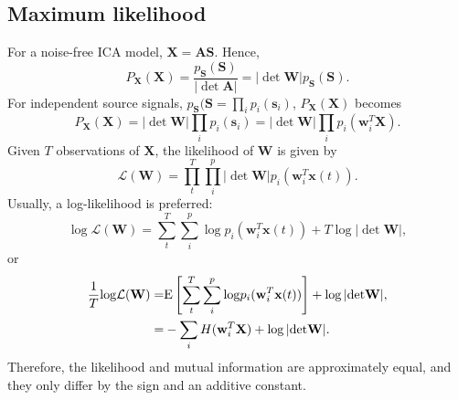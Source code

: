 \subsection{Maximum likelihood\label{Sec:DR:ICA:ML}}
For a noise-free ICA model, $\mathbf{X}=\mathbf{AS}$. Hence,
\begin{equation}
	P_\mathbf{X}(\mathbf{X})=\frac{p_\mathbf{S}(\mathbf{S})}{|{\operatorname{det}}\mathbf{A}|}=|{\operatorname{det}}\mathbf{W}|p_\mathbf{S}(\mathbf{S}).
\end{equation}
For independent source signals, $p_\mathbf{S}(\mathbf{S}=\prod_ip_i(\mathbf{s}_i)$, $P_\mathbf{X}(\mathbf{X})$ becomes
\begin{equation}
	P_\mathbf{X}(\mathbf{X})=|{\operatorname{det}}\mathbf{W}|\prod_ip_i(\mathbf{s}_i)=|{\operatorname{det}}\mathbf{W}|\prod_ip_i(\mathbf{w}_i^T\mathbf{X}).
\end{equation}
Given $T$ observations of $\mathbf{X}$, the likelihood of $\mathbf{W}$ is given by
\begin{equation}
	\mathcal{L}(\mathbf{W})=\prod_t^T\prod_i^p|{\operatorname{det}}\mathbf{W}|p_i(\mathbf{w}_i^T\mathbf{x}(t)).
\end{equation}
Usually, a log-likelihood is preferred:
\begin{equation}
	{\operatorname{log}}\mathcal{L}(\mathbf{W})=\sum_t^T\sum_i^p{\operatorname{log}}p_i(\mathbf{w}_i^T\mathbf{x}(t))+T\operatorname{log}|{\operatorname{det}}\mathbf{W}|,
\end{equation}
or
\begin{align}
	\frac{1}{T}{\operatorname{log}}\mathcal{L}(\mathbf{W})=&{\operatorname{E}}\left[\sum_t^T\sum_i^p{\operatorname{log}}p_i(\mathbf{w}_i^T\mathbf{x}(t))\right]+\operatorname{log}|{\operatorname{det}}\mathbf{W}|,\notag\\
	=&-\sum_i H(\mathbf{w}_i^T\mathbf{X})+\operatorname{log}|{\operatorname{det}}\mathbf{W}|.
\end{align}
Therefore, the likelihood and mutual information are approximately equal, and they only differ by the sign and an additive constant.